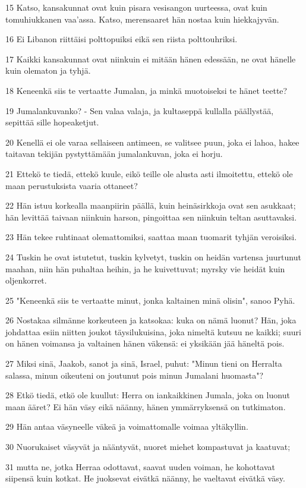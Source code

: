 \par 15 Katso, kansakunnat ovat kuin pisara vesisangon uurteessa, ovat kuin tomuhiukkanen vaa'assa. Katso, merensaaret hän nostaa kuin hiekkajyvän.
\par 16 Ei Libanon riittäisi polttopuiksi eikä sen riista polttouhriksi.
\par 17 Kaikki kansakunnat ovat niinkuin ei mitään hänen edessään, ne ovat hänelle kuin olematon ja tyhjä.
\par 18 Keneenkä siis te vertaatte Jumalan, ja minkä muotoiseksi te hänet teette?
\par 19 Jumalankuvanko? - Sen valaa valaja, ja kultaseppä kullalla päällystää, sepittää sille hopeaketjut.
\par 20 Kenellä ei ole varaa sellaiseen antimeen, se valitsee puun, joka ei lahoa, hakee taitavan tekijän pystyttämään jumalankuvan, joka ei horju.
\par 21 Ettekö te tiedä, ettekö kuule, eikö teille ole alusta asti ilmoitettu, ettekö ole maan perustuksista vaaria ottaneet?
\par 22 Hän istuu korkealla maanpiirin päällä, kuin heinäsirkkoja ovat sen asukkaat; hän levittää taivaan niinkuin harson, pingoittaa sen niinkuin teltan asuttavaksi.
\par 23 Hän tekee ruhtinaat olemattomiksi, saattaa maan tuomarit tyhjän veroisiksi.
\par 24 Tuskin he ovat istutetut, tuskin kylvetyt, tuskin on heidän vartensa juurtunut maahan, niin hän puhaltaa heihin, ja he kuivettuvat; myrsky vie heidät kuin oljenkorret.
\par 25 "Keneenkä siis te vertaatte minut, jonka kaltainen minä olisin", sanoo Pyhä.
\par 26 Nostakaa silmänne korkeuteen ja katsokaa: kuka on nämä luonut? Hän, joka johdattaa esiin niitten joukot täysilukuisina, joka nimeltä kutsuu ne kaikki; suuri on hänen voimansa ja valtainen hänen väkensä: ei yksikään jää häneltä pois.
\par 27 Miksi sinä, Jaakob, sanot ja sinä, Israel, puhut: "Minun tieni on Herralta salassa, minun oikeuteni on joutunut pois minun Jumalani huomasta"?
\par 28 Etkö tiedä, etkö ole kuullut: Herra on iankaikkinen Jumala, joka on luonut maan ääret? Ei hän väsy eikä näänny, hänen ymmärryksensä on tutkimaton.
\par 29 Hän antaa väsyneelle väkeä ja voimattomalle voimaa yltäkyllin.
\par 30 Nuorukaiset väsyvät ja nääntyvät, nuoret miehet kompastuvat ja kaatuvat;
\par 31 mutta ne, jotka Herraa odottavat, saavat uuden voiman, he kohottavat siipensä kuin kotkat. He juoksevat eivätkä näänny, he vaeltavat eivätkä väsy.

